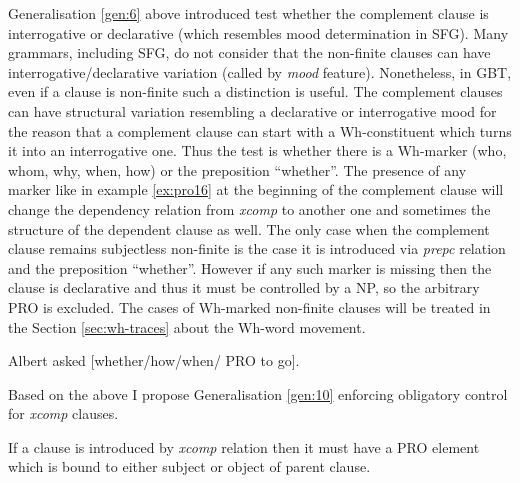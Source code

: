 Generalisation \ref{gen:6} above introduced test whether the complement clause is interrogative or declarative (which resembles mood determination in SFG). Many grammars, including SFG, do not consider that the non-finite clauses can have interrogative/declarative variation (called by \citet[107-167]{Halliday2004} \textit{mood} feature). Nonetheless, in GBT, even if a clause is non-finite such a distinction is useful. The complement clauses can have structural variation resembling a declarative or interrogative mood for the reason that a complement clause can start with a Wh-constituent which turns it into an interrogative one. Thus the test is whether there is a Wh-marker (who, whom, why, when, how) or the preposition ``whether''. The presence of any marker like in example \ref{ex:pro16} at the beginning of the complement clause will change the dependency relation from \textit{xcomp} to another one and sometimes the structure of the dependent clause as well. The only case when the complement clause remains subjectless non-finite is the case it is introduced via \textit{prepc} relation and the preposition ``whether''. However if any such marker is missing then the clause is declarative and thus it must be controlled by a NP, so the arbitrary PRO is excluded. The cases of Wh-marked non-finite clauses will be treated in the Section \ref{sec:wh-traces} about the Wh-word movement.

\begin{exe}
	\ex \label{ex:pro16}Albert asked [whether/how/when/ PRO to go].
\end{exe}

Based on the above I propose Generalisation \ref{gen:10} enforcing obligatory control for \textit{xcomp} clauses.


\begin{generalization}\label{gen:10}
	If a clause is introduced by \textit{xcomp} relation then it must have a PRO element which is bound to either subject or object of parent clause.
\end{generalization}

